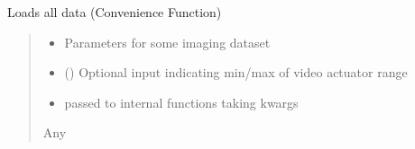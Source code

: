 \documentclass[letterpaper,10pt,english]{sphinxmanual}
\begin{document}
\begin{fulllineitems}
\begin{fulllineitems}
\label{\detokenize{BurrowFearConditioning:BurrowFearConditioning.FearConditioning.load_data}}
\pysigstartsignatures
{}
\pysigstopsignatures
\sphinxAtStartPar
Loads all data (Convenience Function)
\begin{quote}\begin{description}
\begin{itemize}
\item {} 
\sphinxAtStartPar
{} \textendash{} Parameters for some imaging dataset

\item {} 
\sphinxAtStartPar
{} (\sphinxstyleliteralemphasis{\sphinxupquote{{[}}}\sphinxstyleliteralemphasis{\sphinxupquote{, }}\sphinxstyleliteralemphasis{\sphinxupquote{{]}}}) \textendash{} Optional input indicating min/max of video actuator range

\item {} 
\sphinxAtStartPar
{} \textendash{} passed to internal functions taking kwargs

\end{itemize}

\sphinxAtStartPar
Any

\end{description}\end{quote}

\end{fulllineitems}



\end{fulllineitems}
\end{document}
